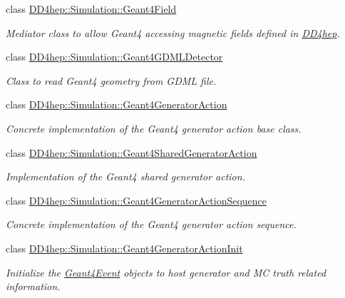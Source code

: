 \begin{DoxyCompactItemize}
class \hyperlink{class_d_d4hep_1_1_simulation_1_1_geant4_field}{DD4hep::Simulation::Geant4Field}
\begin{DoxyCompactList}\small\item\em Mediator class to allow Geant4 accessing magnetic fields defined in \hyperlink{namespace_d_d4hep}{DD4hep}. \item\end{DoxyCompactList}\item 
class \hyperlink{class_d_d4hep_1_1_simulation_1_1_geant4_g_d_m_l_detector}{DD4hep::Simulation::Geant4GDMLDetector}
\begin{DoxyCompactList}\small\item\em Class to read Geant4 geometry from GDML file. \item\end{DoxyCompactList}\item 
class \hyperlink{class_d_d4hep_1_1_simulation_1_1_geant4_generator_action}{DD4hep::Simulation::Geant4GeneratorAction}
\begin{DoxyCompactList}\small\item\em Concrete implementation of the Geant4 generator action base class. \item\end{DoxyCompactList}\item 
class \hyperlink{class_d_d4hep_1_1_simulation_1_1_geant4_shared_generator_action}{DD4hep::Simulation::Geant4SharedGeneratorAction}
\begin{DoxyCompactList}\small\item\em Implementation of the Geant4 shared generator action. \item\end{DoxyCompactList}\item 
class \hyperlink{class_d_d4hep_1_1_simulation_1_1_geant4_generator_action_sequence}{DD4hep::Simulation::Geant4GeneratorActionSequence}
\begin{DoxyCompactList}\small\item\em Concrete implementation of the Geant4 generator action sequence. \item\end{DoxyCompactList}\item 
class \hyperlink{class_d_d4hep_1_1_simulation_1_1_geant4_generator_action_init}{DD4hep::Simulation::Geant4GeneratorActionInit}
\begin{DoxyCompactList}\small\item\em Initialize the \hyperlink{class_d_d4hep_1_1_simulation_1_1_geant4_event}{Geant4Event} objects to host generator and MC truth related information. \item\end{DoxyCompactList}\item 

\end{DoxyCompactItemize}
